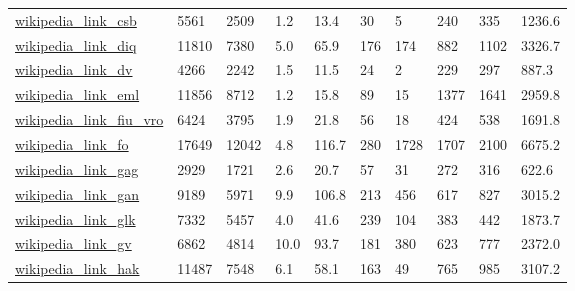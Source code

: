 \begin{longtable}{llllllllll}
 \href{http://konect.cc/networks/wikipedia_link_en}{wikipedia\_link\_csb}                                                     & 5561       & 2509  & 1.2    & 13.4   & 30    & 5      & 240    & 335    & 1236.6  \\
 \href{http://konect.cc/networks/wikipedia_link_en}{wikipedia\_link\_diq}                                                     & 11810      & 7380  & 5.0    & 65.9   & 176   & 174    & 882    & 1102   & 3326.7  \\
 \href{http://konect.cc/networks/wikipedia_link_en}{wikipedia\_link\_dv}                                                      & 4266       & 2242  & 1.5    & 11.5   & 24    & 2      & 229    & 297    & 887.3   \\
 \href{http://konect.cc/networks/wikipedia_link_en}{wikipedia\_link\_eml}                                                     & 11856      & 8712  & 1.2    & 15.8   & 89    & 15     & 1377   & 1641   & 2959.8  \\
 \href{http://konect.cc/networks/wikipedia_link_en}{wikipedia\_link\_fiu\_vro}                                                 & 6424       & 3795  & 1.9    & 21.8   & 56    & 18     & 424    & 538    & 1691.8  \\
 \href{http://konect.cc/networks/wikipedia_link_en}{wikipedia\_link\_fo}                                                      & 17649      & 12042 & 4.8    & 116.7  & 280   & 1728   & 1707   & 2100   & 6675.2  \\
 \href{http://konect.cc/networks/wikipedia_link_en}{wikipedia\_link\_gag}                                                     & 2929       & 1721  & 2.6    & 20.7   & 57    & 31     & 272    & 316    & 622.6   \\
 \href{http://konect.cc/networks/wikipedia_link_en}{wikipedia\_link\_gan}                                                     & 9189       & 5971  & 9.9    & 106.8  & 213   & 456    & 617    & 827    & 3015.2  \\
 \href{http://konect.cc/networks/wikipedia_link_en}{wikipedia\_link\_glk}                                                     & 7332       & 5457  & 4.0    & 41.6   & 239   & 104    & 383    & 442    & 1873.7  \\
 \href{http://konect.cc/networks/wikipedia_link_en}{wikipedia\_link\_gv}                                                      & 6862       & 4814  & 10.0   & 93.7   & 181   & 380    & 623    & 777    & 2372.0  \\
 \href{http://konect.cc/networks/wikipedia_link_en}{wikipedia\_link\_hak}                                                     & 11487      & 7548  & 6.1    & 58.1   & 163   & 49     & 765    & 985    & 3107.2  \\

\end{longtable}
